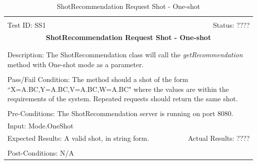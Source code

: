 \documentclass[11pt]{article}
\begin{document}
\begin{center}
\begin{table}[H]
\begin{tabular}{|l r|}\hline&\\[-2mm]
	Test ID: SS1	&Status: ????\\[-3mm]
	\multicolumn{2}{|c|}{\textbf{\large{ShotRecommendation Request Shot - One-shot}}}\\&\\\hline&\\[-3mm]
	\multicolumn{2}{|p{\textwidth}|}{Description: The ShotRecommendation class will call the \textit{getRecommendation} method with One-shot mode as a parameter.}\\[1mm]\hline&\\[-3mm]
	\multicolumn{2}{|p{\textwidth}|}{Pass/Fail Condition: The method should a shot of the form ``X=A.BC,Y=A.BC,V=A.BC,W=A.BC" where the values are within the requirements of the system. Repeated requests should return the same shot.}\\[1mm]\hline&\\[-3mm]
	\multicolumn{2}{|p{\textwidth}|}{Pre-Conditions: The ShotRecommendation server is running on port 8080.}\\[4mm]
	\multicolumn{2}{|p{\textwidth}|}{Input: Mode.OneShot}\\[2mm]\hline
	\multicolumn{1}{|p{0.49\textwidth}}{Expected Results: A valid shot, in string form.}	&\multicolumn{1}{|p{0.45\textwidth}|}{Actual Results: ????}\\\hline&\\[-3mm]
	\multicolumn{2}{|p{\textwidth}|}{Post-Conditions: N/A}\\\hline
\end{tabular}
\caption{ShotRecommendation Request Shot - One-shot}
\end{table}
\end{center}
\end{document}
